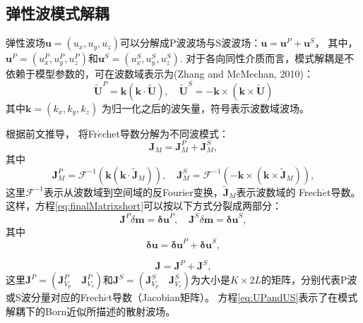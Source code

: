 \subsection{弹性波模式解耦}
弹性波场$\mathbf{u}=(u_x,u_y,u_z)$可以分解成P波波场与S波波场：$\mathbf{u}=\mathbf{u}^P+\mathbf{u}^S$，
其中，$\mathbf{u}^P=(u^P_x,u^P_y,u^P_z)$和$\mathbf{u}^S=(u^S_x,u^S_y,u^S_z)$.
对于各向同性介质而言，模式解耦是不依赖于模型参数的，可在波数域表示为(Zhang and McMechan, 2010)\cite[]{zhang.mcmechan:2010}：
\begin{equation}
        \tilde{\mathbf U}^P=\mathbf k(\mathbf k\cdot \tilde{\mathbf U}), \quad
        \tilde{\mathbf U}^S=-\mathbf 
        k\times(\mathbf k\times \tilde{\mathbf U})
\label{eq:Decomp}
\end{equation}
其中$\mathbf k=(k_x,k_y,k_z)$ 为归一化之后的波矢量，符号$\tilde{}$表示波数域波场。

根据前文推导， 将Fr{$\acute{e}$}chet导数分解为不同波模式：
\begin{equation}
        {\mathbf J}_M={\mathbf J}^P_M+{\mathbf J}^S_M,
\label{eq:PropaMDall}
\end{equation}
其中
\begin{equation}
        {\mathbf J}^P_M=\mathcal{F}^{-1}(\mathbf k(\mathbf k\cdot \tilde{\mathbf
        J}_M)), \quad
        {\mathbf J}^S_M=\mathcal{F}^{-1}(-\mathbf
                k\times(\mathbf k\times \tilde{\mathbf J}_M)),
\label{eq:PropaMDsplit}
\end{equation}
这里$\mathcal{F}^{-1}$表示从波数域到空间域的反Fourier变换，$\tilde{\mathbf{J}}_M$表示波数域的 Frech{$\acute{e}$}t导数。
这样，方程\eqref{eq:finalMatrixshort}可以按以下方式分裂成两部分：
\begin{equation}
        \mathbf{J}^P\delta\mathbf{m}=\mathbf{\delta u}^P,\quad
        \mathbf{J}^S\delta\mathbf{m}=\mathbf{\delta u}^S,
        \label{eq:UPandUS}
\end{equation}
其中
\begin{equation}
        \mathbf{\delta u}=\mathbf{\delta u}^P+\mathbf{\delta u}^S,
        \label{eq:UPS}
\end{equation}

\begin{equation}
        \mathbf{J}=\mathbf{J}^P+\mathbf{J}^S,
        \label{eq:JPS}
\end{equation}
这里$\mathbf{J}^P=(\mathbf{J}^P_{V_p}\quad\mathbf{J}^P_{V_s})$和$\mathbf{J}^S=(\mathbf{J}^S_{V_p}\quad\mathbf{J}^S_{V_s})$为大小是$K\times{2L}$的矩阵，分别代表P波或S波分量对应的Frech{$\acute{e}$}t导数（Jacobian矩阵）。
方程\eqref{eq:UPandUS}表示了在模式解耦下的Born近似所描述的散射波场。

